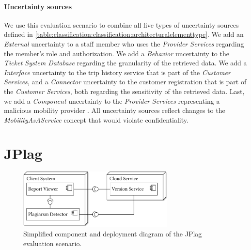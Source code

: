 \paragraph{Uncertainty sources}
We use this evaluation scenario to combine all five types of uncertainty sources defined in \autoref{table:classification:classification:architecturalelementtype}.
We add an \emph{External} uncertainty to a staff member who uses the \emph{Provider Services} regarding the member's role and authorization.
We add a \emph{Behavior} uncertainty to the \emph{Ticket System Database} regarding the granularity of the retrieved data.
We add a \emph{Interface} uncertainty to the trip history service that is part of the \emph{Customer Services}, and a \emph{Connector} uncertainty to the customer registration that is part of the \emph{Customer Services}, both regarding the sensitivity of the retrieved data.
Last, we add a \emph{Component} uncertainty to the \emph{Provider Services} representing a malicious mobility provider \cite{leinweber_leveraging_2023}.
All uncertainty sources reflect changes to the \emph{MobilityAsAService} concept that would violate confidentiality.





\section{JPlag}%
\label{sec:evaluationscenarios:jplag}

\begin{figure}
    \centering
    \includegraphics[width=0.7\textwidth]{figures/chapter8/scenario6_jplag.pdf}
    \caption{Simplified component and deployment diagram of the JPlag evaluation scenario.}
    \label{fig:evaluationscenarios:jplag}
\end{figure}

